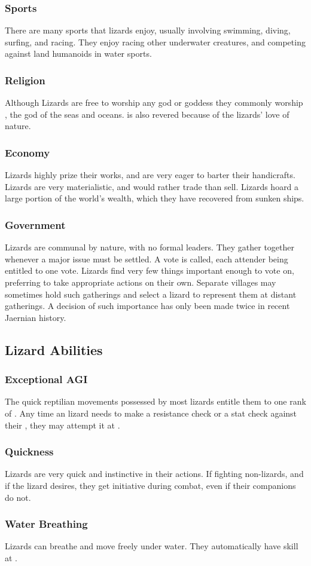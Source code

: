 \begin{multicols*}{2}
\subsubsection{Sports}
There are many sports that lizards enjoy, usually involving swimming, diving, surfing, and racing. They enjoy racing other underwater creatures, and competing against land humanoids in water sports.
\subsubsection{Religion}
Although Lizards are free to worship any god or goddess they commonly worship , the god of the seas and oceans.  is also revered because of the lizards' love of nature.
\subsubsection{Economy}
Lizards highly prize their works, and are very eager to barter their handicrafts. Lizards are very materialistic, and would rather trade than sell. Lizards hoard a large portion of the world's wealth, which they have recovered from sunken ships.
\subsubsection{Government}
Lizards are communal by nature, with no formal leaders. They gather together whenever a major issue must be settled. A vote is called, each attender being entitled to one vote. Lizards find very few things important enough to vote on, preferring to take appropriate actions on their own. Separate villages may sometimes hold such gatherings and select a lizard to represent them at distant gatherings. A decision of such importance has only been made twice in recent Jaernian history.
\subsection{Lizard Abilities}
\subsubsection{Exceptional AGI}
The quick reptilian movements possessed by most lizards entitle them to one rank of . Any
time an lizard needs to make a resistance check or a stat check
against their \AGI, they may attempt it at .
\subsubsection{Quickness}
Lizards are very quick and instinctive in their actions. If fighting non-lizards, and if the lizard desires, they get initiative during combat, even if their companions do not.
\subsubsection{Water Breathing}
Lizards can breathe and move freely under water. They automatically have  skill at .
\end{multicols*}